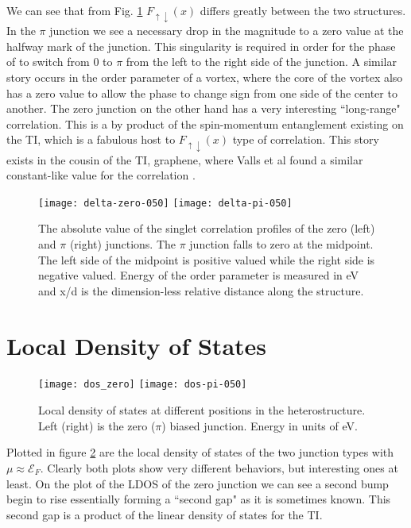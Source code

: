 \documentclass[11pt,revtex,aps]{report}
\begin{document}
We can see that from Fig. \ref{orderjj} $F_{\uparrow\downarrow}(x)$ differs greatly between the two structures. In the $\pi$ junction we see a necessary drop in the magnitude to a zero value at the halfway mark of the junction. This singularity is required in order for the phase of to switch from 0 to $\pi$ from the left to the right side of the junction. A similar story occurs in the order parameter of a vortex, where the core of the vortex also has a zero value to allow the phase to change sign from one side of the center to another. The zero junction on the other hand has a very interesting ``long-range" correlation. This is a by product of the spin-momentum entanglement existing on the TI, which is a fabulous host to $F_{\uparrow\downarrow}(x)$ type of correlation. This story exists in the cousin of the TI, graphene, where Valls et al found a similar constant-like value for the correlation \cite{valls_graphene}. 

\begin{figure}
\texttt{[image: delta-zero-050]}
\texttt{[image: delta-pi-050]}
\caption{The absolute value of the singlet correlation profiles of the zero (left) and $\pi$ (right) junctions. The $\pi$ junction falls to zero at the midpoint. The left side of the midpoint is positive valued while the right side is negative valued. Energy of the order parameter is measured in eV and x/d is the dimension-less relative distance along the structure.
}\label{orderjj}
\end{figure}

\clearpage

\section{Local Density of States}
\begin{figure}
\texttt{[image: dos\_zero]}
\texttt{[image: dos-pi-050]}
\caption{Local density of states at different positions in the heterostructure. Left (right) is the zero ($\pi$) biased junction. Energy in units of eV.
}\label{ldos-jj}
\end{figure}
Plotted in figure \ref{ldos-jj} are the local density of states of the two junction types with $\mu \approx \mathcal{E}_F$. Clearly both plots show very different behaviors, but interesting ones at least. On the plot of the LDOS of the zero junction we can see a second bump begin to rise essentially forming a ``second gap" as it is sometimes known. This second gap is a product of the linear density of states for the TI. 
\end{document}
